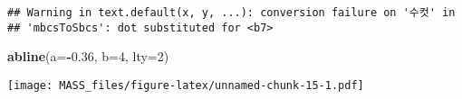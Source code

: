 \documentclass[
]{article}
\newenvironment{Shaded}{\begin{snugshade}}{\end{snugshade}}
\newcommand{\AttributeTok}[1]{\textcolor[rgb]{0.13,0.29,0.53}{#1}}
\newcommand{\DecValTok}[1]{\textcolor[rgb]{0.00,0.00,0.81}{#1}}
\newcommand{\FloatTok}[1]{\textcolor[rgb]{0.00,0.00,0.81}{#1}}
\newcommand{\FunctionTok}[1]{\textcolor[rgb]{0.13,0.29,0.53}{\textbf{#1}}}
\newcommand{\NormalTok}[1]{#1}
\newcommand{\SpecialCharTok}[1]{\textcolor[rgb]{0.81,0.36,0.00}{\textbf{#1}}}
\begin{document}
\begin{verbatim}
## Warning in text.default(x, y, ...): conversion failure on '수컷' in
## 'mbcsToSbcs': dot substituted for <b7>
\end{verbatim}

\begin{Shaded}
\begin{Highlighting}[]
\FunctionTok{abline}\NormalTok{(}\AttributeTok{a=}\SpecialCharTok{{-}}\FloatTok{0.36}\NormalTok{, }\AttributeTok{b=}\DecValTok{4}\NormalTok{, }\AttributeTok{lty=}\DecValTok{2}\NormalTok{)}
\end{Highlighting}
\end{Shaded}

\texttt{[image: MASS\_files/figure-latex/unnamed-chunk-15-1.pdf]}
\end{document}
